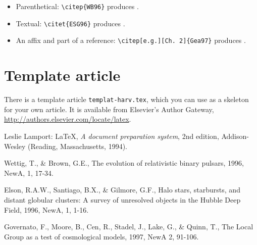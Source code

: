 \documentclass{elsart}
\def\file#1{\texttt{#1}}
\begin{document}
\begin{itemize}
\item Parenthetical: \verb|\citep{WB96}| produces \citep{WB96}.
\item Textual: \verb|\citet{ESG96}| produces \citet{ESG96}.
\item An affix and part of a reference:
   \verb|\citep[e.g.][Ch. 2]{Gea97}|
   produces \citep[e.g.][Ch. 2]{Gea97}.
\end{itemize}

\section{Template article}
\label{templart}

There is a template article \file{templat-harv.tex}, which you can use as a
skeleton for your own article. It is available from Elsevier's Author
Gateway, \url{http://authors.elsevier.com/locate/latex}.

\begin{thebibliography}{}

Leslie Lamport: \LaTeX, {\em A document preparation system},
2nd edition, Addison-Wesley (Reading, Massachusetts, 1994).

Wettig, T., \& Brown, G.E.,
The evolution of relativistic binary pulsars,
1996, NewA, 1, 17-34.

Elson, R.A.W., Santiago, B.X., \& Gilmore, G.F.,
Halo stars, starbursts, and distant globular clusters:
A survey of unresolved objects in the Hubble Deep Field,
1996, NewA, 1, 1-16.

Governato, F., Moore, B., Cen, R., Stadel, J., Lake, G., \& Quinn, T.,
The Local Group as a test of cosmological models,
1997, NewA 2, 91-106.

\end{thebibliography}
\end{document}
